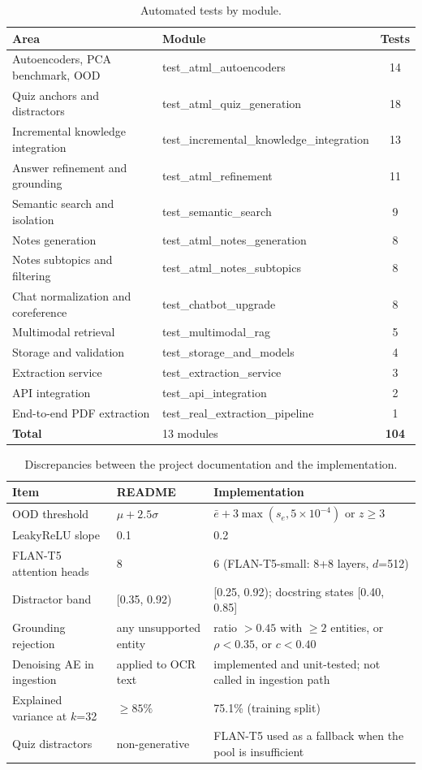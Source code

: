 \documentclass[conference]{IEEEtran}
\begin{document}
\begin{table}[!t]
\centering
\caption{Automated tests by module.}
\label{tab:tests}
\footnotesize
\setlength{\tabcolsep}{4pt}
\begin{tabular}{llc}
\toprule
Area & Module & Tests \\
\midrule
Autoencoders, PCA benchmark, OOD & test\_atml\_autoencoders & 14 \\
Quiz anchors and distractors & test\_atml\_quiz\_generation & 18 \\
Incremental knowledge integration & test\_incremental\_knowledge\_integration & 13 \\
Answer refinement and grounding & test\_atml\_refinement & 11 \\
Semantic search and isolation & test\_semantic\_search & 9 \\
Notes generation & test\_atml\_notes\_generation & 8 \\
Notes subtopics and filtering & test\_atml\_notes\_subtopics & 8 \\
Chat normalization and coreference & test\_chatbot\_upgrade & 8 \\
Multimodal retrieval & test\_multimodal\_rag & 5 \\
Storage and validation & test\_storage\_and\_models & 4 \\
Extraction service & test\_extraction\_service & 3 \\
API integration & test\_api\_integration & 2 \\
End-to-end PDF extraction & test\_real\_extraction\_pipeline & 1 \\
\textbf{Total} & 13 modules & \textbf{104} \\
\bottomrule
\end{tabular}
\end{table}
\begin{table}[!t]
\centering
\caption{Discrepancies between the project documentation and the implementation.}
\label{tab:audit}
\footnotesize
\setlength{\tabcolsep}{4pt}
\begin{tabular}{lll}
\toprule
Item & README & Implementation \\
\midrule
OOD threshold & $\mu + 2.5\sigma$ & $\bar{e} + 3\max(s_e, 5{\times}10^{-4})$ or $z \geq 3$ \\
LeakyReLU slope & 0.1 & 0.2 \\
FLAN-T5 attention heads & 8 & 6 (FLAN-T5-small: 8+8 layers, $d$=512) \\
Distractor band & [0.35, 0.92) & [0.25, 0.92); docstring states [0.40, 0.85] \\
Grounding rejection & any unsupported entity & ratio $>0.45$ with $\geq 2$ entities, or $\rho<0.35$, or $c<0.40$ \\
Denoising AE in ingestion & applied to OCR text & implemented and unit-tested; not called in ingestion path \\
Explained variance at $k$=32 & $\geq 85\%$ & 75.1\% (training split) \\
Quiz distractors & non-generative & FLAN-T5 used as a fallback when the pool is insufficient \\
\bottomrule
\end{tabular}
\end{table}
\end{document}
